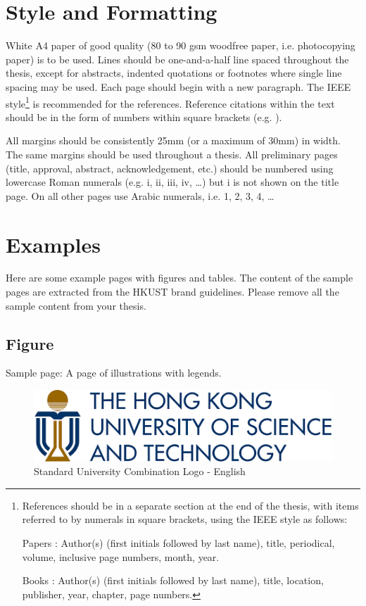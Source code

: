 \section{Style and Formatting}
White A4 paper of good quality (80 to 90 gsm woodfree paper, i.e. photocopying
paper) is to be used. Lines should be one-and-a-half line spaced throughout the
thesis, except for abstracts, indented quotations or footnotes where single line spacing
may be used. Each page should begin with a new paragraph. The IEEE style\footnote{References should be in a separate section at the end of the thesis, with items referred to by
numerals in square brackets, using the IEEE style as follows:

Papers : Author(s) (first initials followed by last name), title, periodical, volume, inclusive
page numbers, month, year.

Books : Author(s) (first initials followed by last name), title, location, publisher, year,
chapter, page numbers.} is
recommended for the references. Reference citations within the text should be in the
form of numbers within square brackets (e.g. \citep{guidelines}).

All margins should be consistently 25mm (or a maximum of 30mm) in width. The
same margins should be used throughout a thesis. All preliminary pages (title,
approval, abstract, acknowledgement, etc.) should be numbered using lowercase
Roman numerals (e.g. i, ii, iii, iv, …) but i is not shown on the title page. On all other
pages use Arabic numerals, i.e. 1, 2, 3, 4, …

\section{Examples}
Here are some example pages with figures and tables. The content of the sample pages are extracted from the HKUST brand guidelines. Please remove all the sample content from your thesis.

\subsection{Figure}
Sample page: A page of illustrations with legends.
\begin{figure}[htb]
\centering
\includegraphics[width=0.5\columnwidth]{figure/fig_HKUST.png}
\caption{Standard University Combination Logo - English}
\label{fig_HKUST}
\end{figure}

